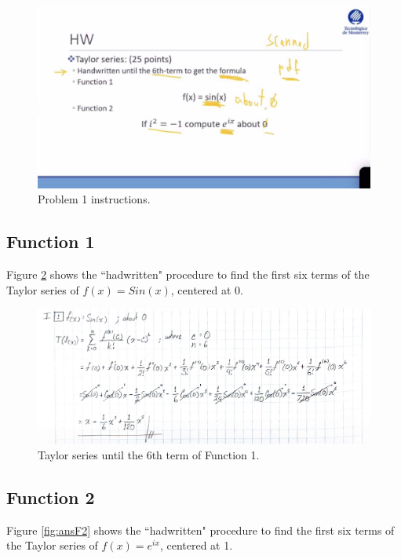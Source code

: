 \documentclass[11pt,a4paper]{article}
\begin{document}
\begin{figure}[!h]
\centering
\includegraphics[width=\textwidth]{./img/instructionsP1.jpg}
\caption{Problem 1 instructions.\label{fig:P1inst}}
\end{figure}

\subsection{Function 1}\label{subsec:f1}

Figure \ref{fig:ansF1} shows the ``hadwritten" procedure to find the first six terms of the Taylor series of $ f(x) = Sin(x) $, centered at 0.

\begin{figure}[!h]
\centering
\includegraphics[width=\textwidth]{./img/P1_part1.jpg}
\caption{Taylor series until the 6th term of Function 1.\label{fig:ansF1}}
\end{figure}

\clearpage

\subsection{Function 2}\label{subsec:f2}

Figure \ref{fig:ansF2} shows the ``hadwritten" procedure to find the first six terms of the Taylor series of $ f(x) = e^{ix} $, centered at 1.
\end{document}

